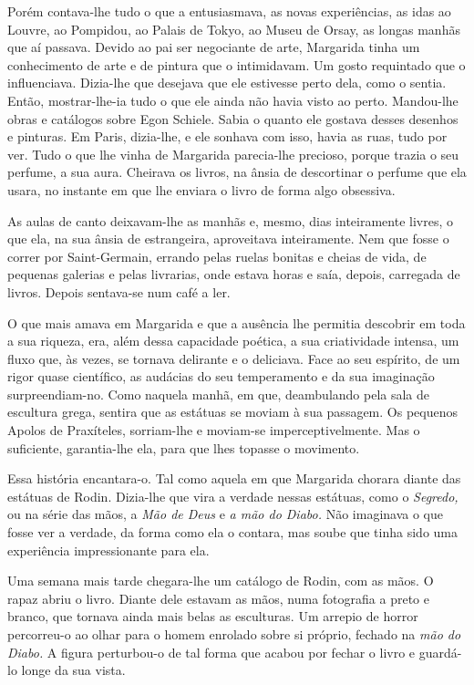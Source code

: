 Porém contava-lhe tudo o que a entusiasmava, as novas experiências, as
idas ao Louvre, ao Pompidou, ao Palais de Tokyo, ao Museu de Orsay, as
longas manhãs que aí passava. Devido ao pai ser negociante de arte,
Margarida tinha um conhecimento de arte e de pintura que o intimidavam.
Um gosto requintado que o influenciava. Dizia-lhe que desejava que ele
estivesse perto dela, como o sentia. Então, mostrar-lhe-ia tudo o que
ele ainda não havia visto ao perto. Mandou-lhe obras e catálogos sobre
Egon Schiele. Sabia o quanto ele gostava desses desenhos e pinturas. Em
Paris, dizia-lhe, e ele sonhava com isso, havia as ruas, tudo por ver.
Tudo o que lhe vinha de Margarida parecia-lhe precioso, porque trazia o
seu perfume, a sua aura. Cheirava os livros, na ânsia de descortinar o
perfume que ela usara, no instante em que lhe enviara o livro de forma
algo obsessiva.

As aulas de canto deixavam-lhe as manhãs e, mesmo, dias inteiramente
livres, o que ela, na sua ânsia de estrangeira, aproveitava
inteiramente. Nem que fosse o correr por Saint-Germain, errando pelas
ruelas bonitas e cheias de vida, de pequenas galerias e pelas livrarias,
onde estava horas e saía, depois, carregada de livros. Depois sentava-se
num café a ler.

O que mais amava em Margarida e que a ausência lhe permitia descobrir em
toda a sua riqueza, era, além dessa capacidade poética, a sua
criatividade intensa, um fluxo que, às vezes, se tornava delirante e o
deliciava. Face ao seu espírito, de um rigor quase científico, as
audácias do seu temperamento e da sua imaginação surpreendiam-no. Como
naquela manhã, em que, deambulando pela sala de escultura grega, sentira
que as estátuas se moviam à sua passagem. Os pequenos Apolos de
Praxíteles, sorriam-lhe e moviam-se imperceptivelmente. Mas o
suficiente, garantia-lhe ela, para que lhes topasse o movimento.

Essa história encantara-o. Tal como aquela em que Margarida chorara
diante das estátuas de Rodin. Dizia-lhe que vira a verdade nessas
estátuas, como o \emph{Segredo, }ou na série das mãos, a \emph{Mão de
Deus }e\emph{ a mão do Diabo.} Não imaginava o que fosse ver a verdade,
da forma como ela o contara, mas soube que tinha sido uma experiência
impressionante para ela.

Uma semana mais tarde chegara-lhe um catálogo de Rodin, com as mãos. O
rapaz abriu o livro. Diante dele estavam as mãos, numa fotografia a
preto e branco, que tornava ainda mais belas as esculturas. Um arrepio
de horror percorreu-o ao olhar para o homem enrolado sobre si próprio,
fechado na \emph{mão do Diabo.} A figura perturbou-o de tal forma que
acabou por fechar o livro e guardá-lo longe da sua vista.

